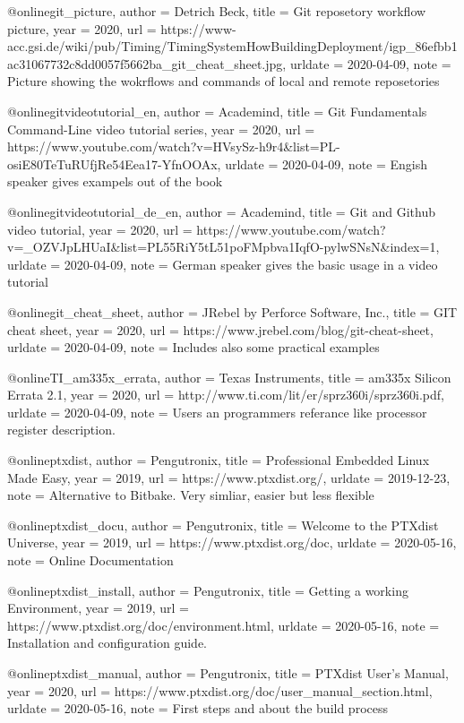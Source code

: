 @online{git_picture,
author = {Detrich Beck},
title = {Git reposetory workflow picture},
year = 2020,
url =
{https://www-acc.gsi.de/wiki/pub/Timing/TimingSystemHowBuildingDeployment/igp_86efbb1ac31067732c8dd0057f5662ba_git_cheat_sheet.jpg},
urldate = {2020-04-09},
note = {Picture showing the wokrflows and commands of local and remote
    reposetories}
}

@online{gitvideotutorial_en,
author = {Academind},
title = {Git Fundamentals Command-Line video tutorial series},
year = 2020,
url = {https://www.youtube.com/watch?v=HVsySz-h9r4&list=PL-osiE80TeTuRUfjRe54Eea17-YfnOOAx},
urldate = {2020-04-09},
note = {Engish speaker gives exampels out of the book~\cite{Chacon2014}}
}


@online{gitvideotutorial_de_en,
author = {Academind},
title = {Git and Github video tutorial},
year = 2020,
url = {https://www.youtube.com/watch?v=_OZVJpLHUaI&list=PL55RiY5tL51poFMpbva1IqfO-pylwSNsN&index=1},
urldate = {2020-04-09},
note = {German speaker gives the basic usage in a video tutorial}
}


@online{git_cheat_sheet,
author = {JRebel by Perforce Software, Inc.},
title = {GIT cheat sheet},
year = 2020,
url = {https://www.jrebel.com/blog/git-cheat-sheet},
urldate = {2020-04-09},
note = {Includes also some practical examples}
}


@online{TI_am335x_errata,
author = {Texas Instruments},
title = {am335x Silicon Errata 2.1},
year = 2020,
url = {http://www.ti.com/lit/er/sprz360i/sprz360i.pdf},
urldate = {2020-04-09},
note = {Users an programmers referance like processor register description.}
}

@online{ptxdist,
    author = {Pengutronix},
    title = {Professional Embedded Linux Made Easy},
    year = 2019,
    url = {https://www.ptxdist.org/},
    urldate = {2019-12-23},
    note = { Alternative to Bitbake. Very simliar, easier but less flexible}
}

@online{ptxdist_docu,
    author = {Pengutronix},
    title = {Welcome to the PTXdist Universe},
    year = 2019,
    url = {https://www.ptxdist.org/doc},
    urldate = {2020-05-16},
    note = {Online Documentation}
}

@online{ptxdist_install,
    author = {Pengutronix},
    title = {Getting a working Environment},
    year = 2019,
    url = {https://www.ptxdist.org/doc/environment.html},
    urldate = {2020-05-16},
    note = {Installation and configuration guide.}
}

@online{ptxdist_manual,
    author = {Pengutronix},
    title = {PTXdist User's Manual},
    year = 2020,
    url = {https://www.ptxdist.org/doc/user_manual_section.html},
    urldate = {2020-05-16},
    note = {First steps and about the build process}
}

